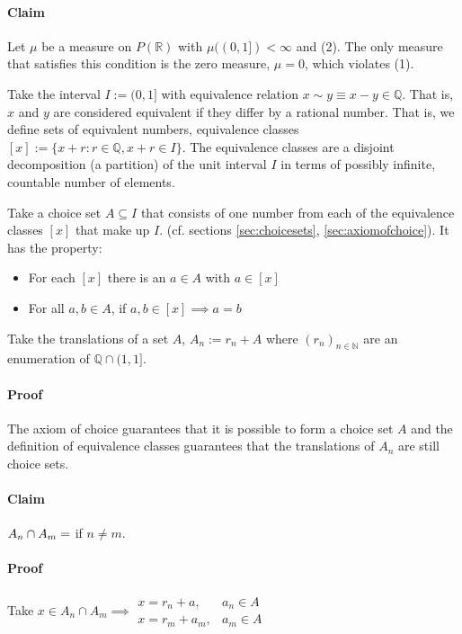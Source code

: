 \paragraph{Claim}
Let $\mu$ be a measure on $P(\mathbb{R})$ with $ \mu ((0,1]) < \infty  $ and (2). The only measure that satisfies this condition is the zero measure, $\mu = 0$, which violates (1).

Take the interval $I:=(0,1]$ with equivalence relation $x\sim y \equiv x-y \in \mathbb{Q}$. That is, $x$ and $y$ are considered equivalent if they differ by a rational number. That is, we define sets of equivalent numbers, equivalence classes  $ [x] := \{ x+r: r \in \mathbb{Q}, x+r \in I \} $. The equivalence classes are a disjoint decomposition (a partition) of the unit interval $I$ in terms of possibly infinite, countable number of elements.

Take a choice set  $A\subseteq I$ that consists of one number from each of the equivalence classes $[x]$ that make up $I$. (cf. sections \ref{sec:choicesets}, \ref{sec:axiomofchoice}). It has the property: 
\begin{itemize}
\item For each $[x]$ there is an $a\in A$ with $a \in [x]$ 
\item For all $a,b \in A$, if $a,b \in [x] \implies a=b$ 
\end{itemize}

Take the translations of a set $A$, $A_n := r_n + A$ where $(r_n)_{n\in\mathbb{N}}$  are an enumeration of $\mathbb{Q}\cap(1,1]$. 

\paragraph{Proof}
The axiom of choice guarantees that it is possible to form a choice set $A$ and the definition of equivalence classes guarantees that the translations of $A_n$ are still choice sets. 

\paragraph{Claim}
$A_n \cap A_m = \empty$ if $n\neq m$.

\paragraph{Proof}
Take $x \in A_n \cap A_m \implies \begin{array}{ll} x = r_n + a, & a_n \in A\\ x = r_m + a_m, & a_m \in A \end{array}$

